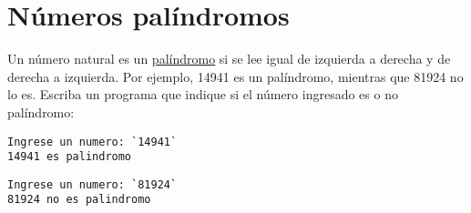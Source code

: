 \section{Números palíndromos}

Un número natural es un
\href{http://es.wikipedia.org/wiki/Pal\%C3\%ADndromo}{palíndromo} si se
lee igual de izquierda a derecha y de derecha a izquierda.
Por ejemplo, 14941 es un palíndromo, mientras que 81924 no lo es.
Escriba un programa que indique si el número ingresado es o no
palíndromo:

\begin{lstlisting}[language=testcase]
Ingrese un numero: `14941`
14941 es palindromo
\end{lstlisting}

\begin{lstlisting}[language=testcase]
Ingrese un numero: `81924`
81924 no es palindromo
\end{lstlisting}
